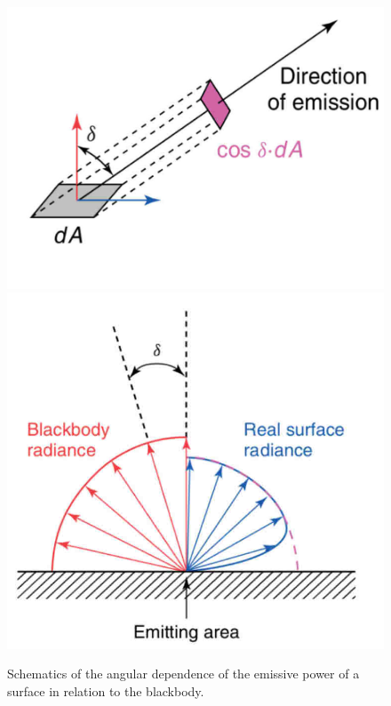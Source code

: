 		\begin{figure}[ht!]
			\centering
			\captionsetup{justification=centering,margin=2cm}
			\includegraphics[scale=0.35]{Figures/Chapter01/AngularDistributionSchematics02.jpg}
			\includegraphics[scale=0.35]{Figures/Chapter01/AngularDistributionSchematics01.jpg}
			\caption{Schematics of the angular dependence of the emissive power of a surface in relation to the blackbody.}\label{fig1.7}
		\end{figure}
		

